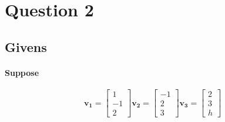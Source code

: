\documentclass{article}
\begin{document}
            \section{Question 2}
                \subsection{Givens}
                    \paragraph{Suppose}
                        \[
                        \mathbf{v_1}=\begin{bmatrix}1\\-1\\2\end{bmatrix}
                        \mathbf{v_2}=\begin{bmatrix}-1\\2\\3\end{bmatrix}
                        \mathbf{v_3}=\begin{bmatrix}2\\3\\h\end{bmatrix}
                        \]
\end{document}
